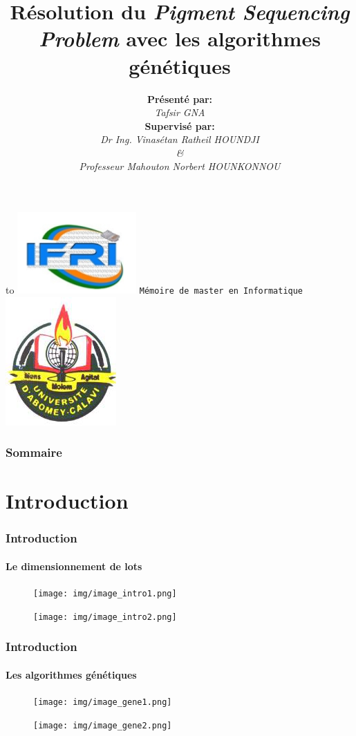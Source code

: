 \documentclass[11pt]{beamer}
\author{\textbf{Présenté par:} \\ \textit{Tafsir GNA} \\ \textbf{Supervisé par:} \\ \textit{Dr Ing. Vinasétan Ratheil HOUNDJI \\ \& \\ Professeur Mahouton Norbert HOUNKONNOU}}
\title{Résolution du \emph{Pigment Sequencing Problem} avec les algorithmes génétiques}
\institute{Institut de Formation et de Recherche en Informatique (IFRI)}
\begin{document}
 
 \begin{frame}
	\hbox to \textwidth
 	{
 		\includegraphics[scale=0.2]{img/ifri_logo.png}
 		\hfill
 		\texttt{Mémoire de master en Informatique}
 		\hfill
 		\includegraphics[scale=0.2]{img/uac_logo.png}
 	}
	\titlepage
\end{frame} 


 
 \begin{frame}
 \frametitle{Sommaire}
 \setcounter{tocdepth}{1}
 \tableofcontents
 \end{frame}

 \section{Introduction}
 \begin{frame}
 \frametitle{Introduction}
 \framesubtitle{Le dimensionnement de lots}
 	\begin{figure}
   \begin{minipage}[c]{.46\linewidth}
      \texttt{[image: img/image\_intro1.png]}
   \end{minipage} \hfill
   \begin{minipage}[c]{.46\linewidth}
      \texttt{[image: img/image\_intro2.png]}
   \end{minipage}
\end{figure}
 \end{frame} 
 
 \begin{frame}
 \frametitle{Introduction}
 \framesubtitle{Les algorithmes génétiques}
 	\begin{figure}
   \begin{minipage}[c]{.46\linewidth}
      \texttt{[image: img/image\_gene1.png]}
   \end{minipage} \hfill
   \begin{minipage}[c]{.46\linewidth}
      \texttt{[image: img/image\_gene2.png]}
   \end{minipage}
\end{figure}
 \end{frame} 
 
\end{document}
